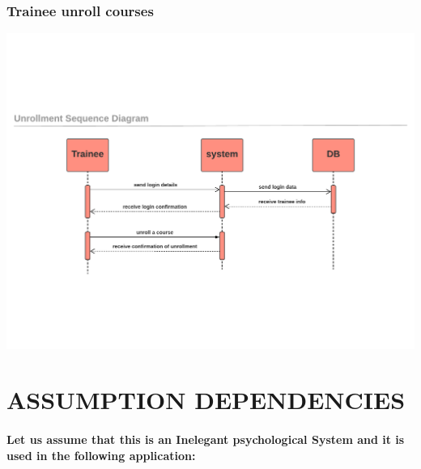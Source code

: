 \documentclass[../Psychological_system_web_application.tex]{subfiles}
\begin{document}
							
							
						\subsubsection{Trainee unroll courses}
							
								\includegraphics[width=\textwidth ,height=0.4\textheight ,scale=4]{Diagrams/sequence_diagram/unrollment.pdf}
								\label{FIG:2.15}
							
							
		\section{ASSUMPTION DEPENDENCIES}
			\paragraph{Let us assume that this is an Inelegant psychological System and it is used in the following application:}
\end{document}

